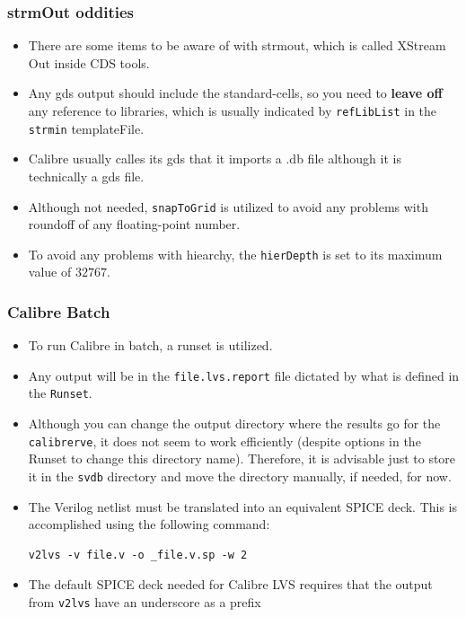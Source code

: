 \documentclass{beamer}
\begin{document}
\begin{frame}[fragile]
\frametitle{strmOut oddities}
\begin{itemize}
\item There are some items to be aware of with strmout, which is
  called XStream Out inside CDS tools.
\item Any gds output should include the standard-cells, so you need to
  \textbf{leave off} any reference to libraries, which is usually indicated by 
  \verb+refLibList+ in the \verb+strmin+ templateFile.
\item Calibre usually calles its gds that it imports a .db file
  although it is technically a gds file.
\item Although not needed, \verb+snapToGrid+ is utilized to avoid any
  problems with roundoff of any floating-point number.
\item To avoid any problems with hiearchy, the \verb+hierDepth+ is set
  to its maximum value of $32767$.
\end{itemize}
\end{frame}
\begin{frame}[fragile]
\frametitle{Calibre Batch}
\begin{itemize}
\item To run Calibre in batch, a runset is utilized.
\item Any output will be in the \verb+file.lvs.report+ file dictated
  by what is defined in the \verb+Runset+.
\item Although you can change the output directory where the results
  go for the \verb+calibrerve+, it does not seem to work efficiently
  (despite options in the Runset to change this directory name).
  Therefore, it is advisable just to store it in the \verb+svdb+
  directory and move the directory manually, if needed, for now.
\item The Verilog netlist must be translated into an equivalent SPICE
  deck.  This is accomplished using the following command:
\begin{verbatim}
v2lvs -v file.v -o _file.v.sp -w 2
\end{verbatim}
\item The default SPICE deck needed for Calibre LVS requires that the output
  from \verb+v2lvs+ have an underscore as a prefix
\end{itemize}
\end{frame}
\end{document}
